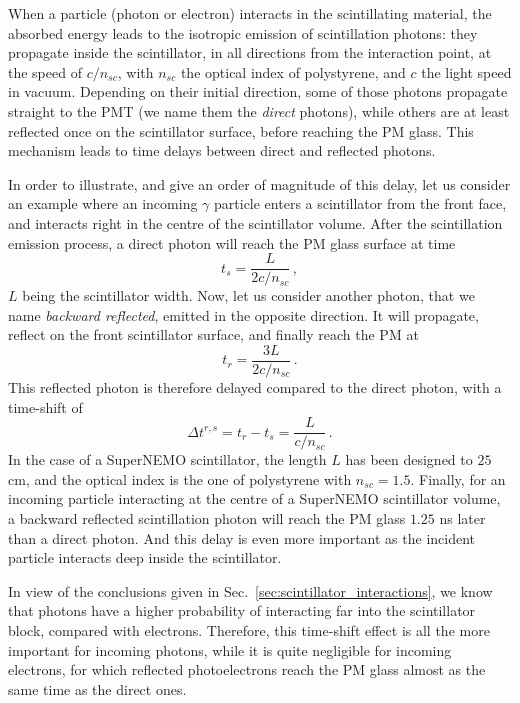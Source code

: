 When a particle (photon or electron) interacts in the scintillating material, the absorbed energy leads to the isotropic emission of scintillation photons:
they propagate inside the scintillator, in all directions from the interaction point, at the speed of $c/n_{sc}$, with $n_{sc}$ the optical index of polystyrene, and $c$ the light speed in vacuum.
Depending on their initial direction, some of those photons propagate straight to the PMT (we name them the \emph{direct} photons), while others are at least reflected once on the scintillator surface, before reaching the PM glass.
This mechanism leads to time delays between direct and reflected photons.

In order to illustrate, and give an order of magnitude of this delay, let us consider an example where an incoming $\gamma$ particle enters a scintillator from the front face, and interacts right in the centre of the scintillator volume.
After the scintillation emission process, a direct photon will reach the PM glass surface at time
\begin{equation}
  t_{s} = \frac{L}{2c/n_{sc}}\,,
\end{equation}
$L$ being the scintillator width.
Now, let us consider another photon, that we name \emph{backward reflected}, emitted in the opposite direction.
It will propagate, reflect on the front scintillator surface, and finally reach the PM at
\begin{equation}
  t_{r} = \frac{3L}{2c/n_{sc}}\,.
\end{equation}
This reflected photon is therefore delayed compared to the direct photon, with a time-shift of
\begin{equation}
  \Delta t^{r,s} = t_{r} - t_{s} = \frac{L}{c/n_{sc}}\,.
\end{equation}
In the case of a SuperNEMO scintillator, the length $L$ has been designed to $25$ cm, and the optical index is the one of polystyrene with $n_{sc}=1.5$.
Finally, for an incoming particle interacting at the centre of a SuperNEMO scintillator volume, a backward reflected scintillation photon will reach the PM glass $1.25$ ns later than a direct photon.
And this delay is even more important as the incident particle interacts deep inside the scintillator.

In view of the conclusions given in Sec.~\ref{sec:scintillator_interactions}, we know that photons have a higher probability of interacting far into the scintillator block, compared with electrons.
Therefore, this time-shift effect is all the more important for incoming photons, while it is quite negligible for incoming electrons, for which reflected photoelectrons reach the PM glass almost as the same time as the direct ones.

